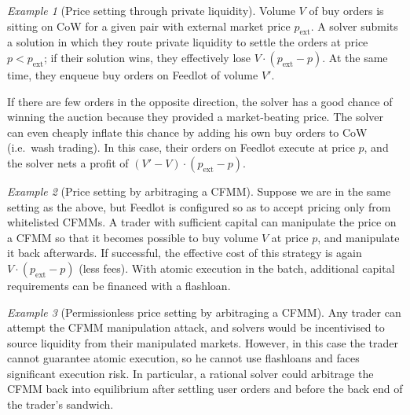 \documentclass[a4paper,10pt]{article}
\theoremstyle{remark}
\newtheorem*{example}{Example}
\begin{document}
\begin{example}[Price setting through private liquidity]

  Volume $V$ of buy orders is sitting on CoW for a given pair with external market price $p_\mathrm{ext}$.
  A solver submits a solution in which they route private liquidity to settle the orders at price $p<p_\mathrm{ext}$; if their solution wins, they effectively lose $V\cdot(p_\mathrm{ext}-p)$.
  At the same time, they enqueue buy orders on Feedlot of volume $V'$.
  
  If there are few orders in the opposite direction, the solver has a good chance of winning the auction because they provided a market-beating price.
  The solver can even cheaply inflate this chance by adding his own buy orders to CoW (i.e.~wash trading).
  In this case, their orders on Feedlot execute at price $p$, and the solver nets a profit of $(V'-V)\cdot(p_\mathrm{ext}-p)$.

\end{example}


\begin{example}[Price setting by arbitraging a CFMM]

  Suppose we are in the same setting as the above, but Feedlot is configured so as to accept pricing only from whitelisted CFMMs.
  A trader with sufficient capital can manipulate the price on a CFMM so that it becomes possible to buy volume $V$ at price $p$, and manipulate it back afterwards.
  If successful, the effective cost of this strategy is again $V\cdot(p_\mathrm{ext}-p)$ (less fees).
  With atomic execution in the batch, additional capital requirements can be financed with a flashloan.

\end{example}

\begin{example}[Permissionless price setting by arbitraging a CFMM]

  Any trader can attempt the CFMM manipulation attack, and solvers would be incentivised to source liquidity from their manipulated markets.
  However, in this case the trader cannot guarantee atomic execution, so he cannot use flashloans and faces significant execution risk.
  In particular, a rational solver could arbitrage the CFMM back into equilibrium after settling user orders and before the back end of the trader's sandwich.

\end{example}
\end{document}
